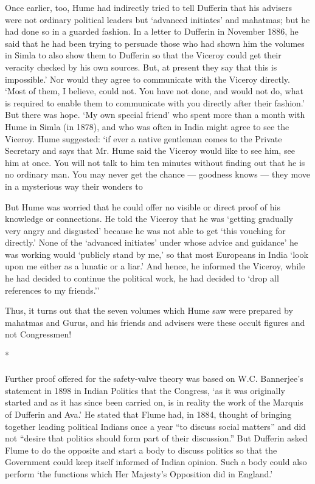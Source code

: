 Once earlier, too, Hume had indirectly tried to tell Dufferin that his advisers were not ordinary political leaders but `advanced initiates' and mahatmas; but he had done so in a guarded fashion. In a letter to Dufferin in November 1886, he said that he had been trying to persuade those who had shown him the volumes in Simla to also show them to Dufferin so that the Viceroy could get their veracity checked by his own sources. But, at present they say that this is impossible.' Nor would they agree to communicate with the Viceroy directly. `Most of them, I believe, could not. You have not done, and would not do, what is required to enable them to communicate with you directly after their fashion.' But there was hope. `My own special friend' who spent more than a month with Hume in Simla (in 1878), and who was often in India might agree to see the Viceroy. Hume suggested: `if ever a native gentleman comes to the Private Secretary and says that Mr. Hume said the Viceroy would like to see him, see him at once. You will not talk to him ten minutes without finding out that he is no ordinary man. You may never get the chance — goodness knows — they move in a mysterious way their wonders to

But Hume was worried that he could offer no visible or direct proof of his knowledge or connections. He told the Viceroy that he was `getting gradually very angry and disgusted' because he was not able to get `this vouching for directly.' None of the `advanced initiates' under whose advice and guidance' he was working would `publicly stand by me,' so that most Europeans in India `look upon me either as a lunatic or a liar.' And hence, he informed the Viceroy, while he had decided to continue the political work, he had decided to `drop all references to my friends.''

Thus, it turns out that the seven volumes which Hume saw were prepared by mahatmas and Gurus, and his friends and advisers were these occult figures and not Congressmen!

\begin{center}*\end{center}

\paragraph*{}
Further proof offered for the safety-valve theory was based on W.C. Bannerjee's statement in 1898 in Indian Politics that the Congress, `as it was originally started and as it has since been carried on, is in reality the work of the Marquis of Dufferin and Ava.' He stated that Flume had, in 1884, thought of bringing together leading political Indians once a year ``to discuss social matters'' and did not ``desire that politics should form part of their discussion.'' But Dufferin asked Flume to do the opposite and start a body to discuss politics so that the Government could keep itself informed of Indian opinion. Such a body could also perform `the functions which Her Majesty's Opposition did in England.'

